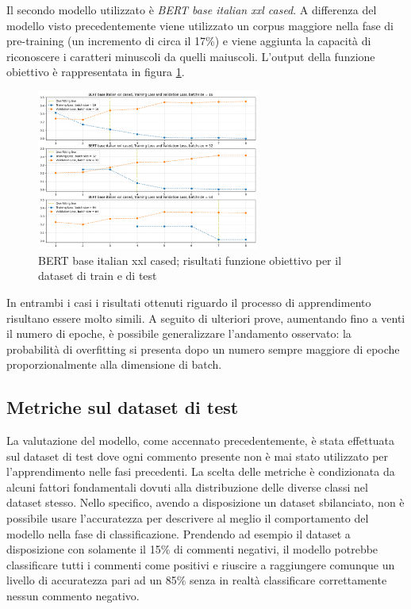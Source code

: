     
    \hspace{0,5cm}
    
    Il secondo modello utilizzato è \textit{BERT base italian xxl cased}. A differenza del modello visto precedentemente viene utilizzato un corpus maggiore nella fase di pre-training (un incremento di circa il 17\%) e viene aggiunta la capacità di riconoscere i caratteri minuscoli da quelli maiuscoli. L'output della funzione obiettivo è rappresentata in figura \ref{fig:losses-xxl}.
    
    \begin{figure}[h]
        \centering
        \includegraphics[width=0.65\textwidth]{pics/bert base italian xxl cased/losses xxl.png}
        \caption{BERT base italian xxl cased; risultati funzione obiettivo per il dataset di train e di test}
        \label{fig:losses-xxl}
    \end{figure}
    
    In entrambi i casi i risultati ottenuti riguardo il processo di apprendimento risultano essere molto simili. A seguito di ulteriori prove, aumentando fino a venti il numero di epoche, è possibile generalizzare l'andamento osservato: la probabilità di overfitting si presenta dopo un numero sempre maggiore di epoche proporzionalmente alla dimensione di batch.

\subsection{Metriche sul dataset di test}
    La valutazione del modello, come accennato precedentemente, è stata effettuata sul dataset di test dove ogni commento presente non è mai stato utilizzato per l'apprendimento nelle fasi precedenti. La scelta delle metriche è condizionata da alcuni fattori fondamentali dovuti alla distribuzione delle diverse classi nel dataset stesso. Nello specifico, avendo a disposizione un dataset sbilanciato, non è possibile usare l'accuratezza per descrivere al meglio il comportamento del modello nella fase di classificazione. Prendendo ad esempio il dataset a disposizione con solamente il 15\% di commenti negativi, il modello potrebbe classificare tutti i commenti come positivi e riuscire a raggiungere comunque un livello di accuratezza pari ad un 85\% senza in realtà classificare correttamente nessun commento negativo.
    
